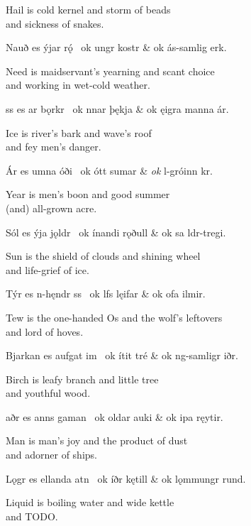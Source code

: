 \bvb Hail is cold kernel and storm of beads \\
and sickness of snakes.\evb\evg


\bvg\bva Nauð es ýjar rǫ́ \hld\ ok ungr kostr &
\ind ok ás-samlig erk.\eva

\bvb Need is maidservant’s yearning and scant choice \\
and working in wet-cold weather.\evb\evg


\bvg\bva {}ss es ar bǫrkr \hld\ ok nnar þękja &
\ind ok ęigra manna ár.\eva

\bvb Ice is river’s bark and wave’s roof \\
and fey men’s danger.\evb\evg


\bvg\bva Ár es umna óði \hld\ ok ótt sumar &
\ind \emph{ok} l-gróinn kr.\eva

\bvb Year is men’s boon and good summer \\
(and) all-grown acre.\evb\evg


\bvg\bva Sól es ýja jǫldr \hld\ ok ínandi rǫðull &
\ind ok sa ldr-tregi.\eva

\bvb Sun is the shield of clouds and shining wheel \\
and life-grief of ice.\evb\evg


\bvg\bva Týr es n-hęndr ss \hld\ ok lfs lęifar &
\ind ok ofa ilmir.\eva

\bvb Tew is the one-handed Os and the wolf’s leftovers \\
and lord of hoves.\evb\evg


\bvg\bva Bjarkan es aufgat im \hld\ ok ítit tré &
\ind ok ng-samligr iðr.\eva

\bvb Birch is leafy branch and little tree \\
and youthful wood.\evb\evg


\bvg\bva {}aðr es anns gaman \hld\ ok oldar auki &
\ind ok ipa ręytir.\eva

\bvb Man is man’s joy and the product of dust \\
and adorner of ships.\evb\evg


\bvg\bva Lǫgr es ellanda atn \hld\ ok íðr kętill &
\ind ok lǫmmungr rund.\eva

\bvb Liquid is boiling water and wide kettle \\
and TODO.\evb\evg


